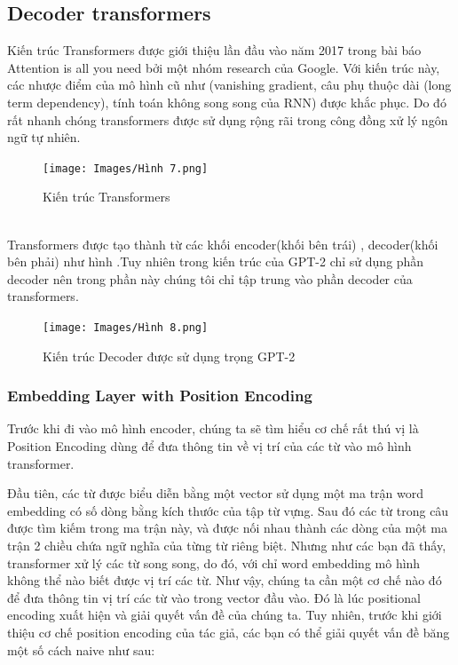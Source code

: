 \documentclass[a4paper]{article}
\theoremstyle{definition}
\begin{document}
\subsection{Decoder transformers}
Kiến trúc Transformers được giới thiệu lần đầu vào năm 2017 trong bài báo Attention is all you need  bởi  một nhóm research của Google. Với kiến trúc này, các nhược điểm của mô hình cũ như (vanishing gradient, câu phụ thuộc dài (long term dependency), tính toán không song song của RNN) được khắc phục. Do đó rất nhanh chóng transformers được sử dụng rộng rãi trong công đồng xử lý ngôn ngữ tự nhiên. 
\begin{figure}[h!]
\begin{center}
\texttt{[image: Images/Hình 7.png]} \\[0.2in]

\caption{Kiến trúc Transformers}
\end{center}
\end{figure}
\\
Transformers được tạo thành từ các khối encoder(khối bên trái) , decoder(khối bên phải) như hình .Tuy nhiên trong kiến trúc của GPT-2 chỉ sử dụng phần decoder nên trong phần này chúng tôi chỉ tập trung vào phần decoder của transformers.
\begin{figure}[h!]
\begin{center}
\texttt{[image: Images/Hình 8.png]} \\[0.2in]

\caption{Kiến trúc Decoder được sử dụng trọng GPT-2}
\end{center}
\end{figure}
\newpage
\subsubsection{Embedding Layer with Position Encoding}
Trước khi đi vào mô hình encoder, chúng ta sẽ tìm hiểu cơ chế rất thú vị là Position Encoding dùng để đưa thông tin về vị trí của các từ vào mô hình transformer.

Đầu tiên, các từ được biểu diễn bằng một vector sử dụng một ma trận word embedding có số dòng bằng kích thước của tập từ vựng. Sau đó các từ trong câu được tìm kiếm trong ma trận này, và được nối nhau thành các dòng của một ma trận 2 chiều chứa ngữ nghĩa của từng từ riêng biệt. Nhưng như các bạn đã thấy, transformer xử lý các từ song song, do đó, với chỉ word embedding mô hình không thể nào biết được vị trí các từ. Như vậy, chúng ta cần một cơ chế nào đó để đưa thông tin vị trí các từ vào trong vector đầu vào. Đó là lúc positional encoding xuất hiện và giải quyết vấn đề của chúng ta. Tuy nhiên, trước khi giới thiệu cơ chế position encoding của tác giả, các bạn có thể giải quyết vấn đề băng một số cách naive như sau:
\end{document}
